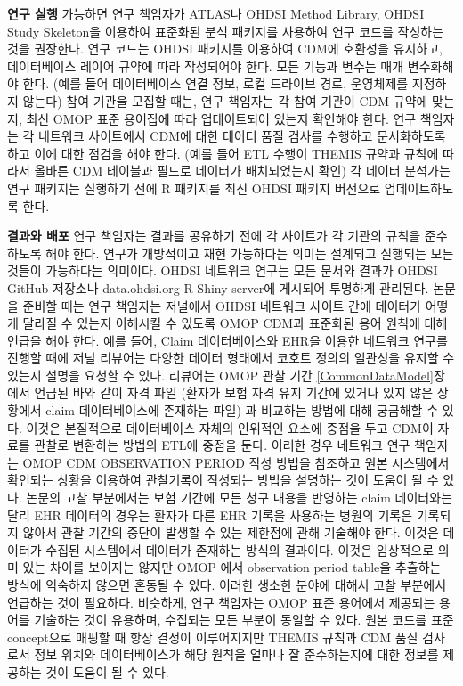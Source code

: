 \documentclass[11pt]{book}
\theoremstyle{definition}
\theoremstyle{definition}
\theoremstyle{definition}
\theoremstyle{remark}
\begin{document}
\textbf{연구 실행} 가능하면 연구 책임자가 ATLAS나 OHDSI Method Library,
OHDSI Study Skeleton을 이용하여 표준화된 분석 패키지를 사용하여 연구
코드를 작성하는 것을 권장한다. 연구 코드는 OHDSI 패키지를 이용하여 CDM에
호환성을 유지하고, 데이터베이스 레이어 규약에 따라 작성되어야 한다. 모든
기능과 변수는 매개 변수화해야 한다. (예를 들어 데이터베이스 연결 정보,
로컬 드라이브 경로, 운영체제를 지정하지 않는다) 참여 기관을 모집할 때는,
연구 책임자는 각 참여 기관이 CDM 규약에 맞는지, 최신 OMOP 표준 용어집에
따라 업데이트되어 있는지 확인해야 한다. 연구 책임자는 각 네트워크
사이트에서 CDM에 대한 데이터 품질 검사를 수행하고 문서화하도록 하고 이에
대한 점검을 해야 한다. (예를 들어 ETL 수행이 THEMIS 규약과 규칙에 따라서
올바른 CDM 테이블과 필드로 데이터가 배치되었는지 확인) 각 데이터
분석가는 연구 패키지는 실행하기 전에 R 패키지를 최신 OHDSI 패키지
버전으로 업데이트하도록 한다.

\textbf{결과와 배포} 연구 책임자는 결과를 공유하기 전에 각 사이트가 각
기관의 규칙을 준수하도록 해야 한다. 연구가 개방적이고 재현 가능하다는
의미는 설계되고 실행되는 모든 것들이 가능하다는 의미이다. OHDSI 네트워크
연구는 모든 문서와 결과가 OHDSI GitHub 저장소나 data.ohdsi.org R Shiny
server에 게시되어 투명하게 관리된다. 논문을 준비할 때는 연구 책임자는
저널에서 OHDSI 네트워크 사이트 간에 데이터가 어떻게 달라질 수 있는지
이해시킬 수 있도록 OMOP CDM과 표준화된 용어 원칙에 대해 언급을 해야
한다. 예를 들어, Claim 데이터베이스와 EHR을 이용한 네트워크 연구를
진행할 때에 저널 리뷰어는 다양한 데이터 형태에서 코호트 정의의 일관성을
유지할 수 있는지 설명을 요청할 수 있다. 리뷰어는 OMOP 관찰 기간
\ref{CommonDataModel}장에서 언급된 바와 같이 자격 파일 (환자가 보험 자격
유지 기간에 있거나 있지 않은 상황에서 claim 데이터베이스에 존재하는
파일) 과 비교하는 방법에 대해 궁금해할 수 있다. 이것은 본질적으로
데이터베이스 자체의 인위적인 요소에 중점을 두고 CDM이 자료를 관찰로
변환하는 방법의 ETL에 중점을 둔다. 이러한 경우 네트워크 연구 책임자는
OMOP CDM OBSERVATION PERIOD 작성 방법을 참조하고 원본 시스템에서
확인되는 상황을 이용하여 관찰기록이 작성되는 방법을 설명하는 것이 도움이
될 수 있다. 논문의 고찰 부분에서는 보험 기간에 모든 청구 내용을 반영하는
claim 데이터와는 달리 EHR 데이터의 경우는 환자가 다른 EHR 기록을
사용하는 병원의 기록은 기록되지 않아서 관찰 기간의 중단이 발생할 수 있는
제한점에 관해 기술해야 한다. 이것은 데이터가 수집된 시스템에서 데이터가
존재하는 방식의 결과이다. 이것은 임상적으로 의미 있는 차이를 보이지는
않지만 OMOP 에서 observation period table을 추출하는 방식에 익숙하지
않으면 혼동될 수 있다. 이러한 생소한 분야에 대해서 고찰 부분에서
언급하는 것이 필요하다. 비슷하게, 연구 책임자는 OMOP 표준 용어에서
제공되는 용어를 기술하는 것이 유용하며, 수집되는 모든 부분이 동일할 수
있다. 원본 코드를 표준 concept으로 매핑할 때 항상 결정이 이루어지지만
THEMIS 규칙과 CDM 품질 검사로서 정보 위치와 데이터베이스가 해당 원칙을
얼마나 잘 준수하는지에 대한 정보를 제공하는 것이 도움이 될 수 있다.
\end{document}
